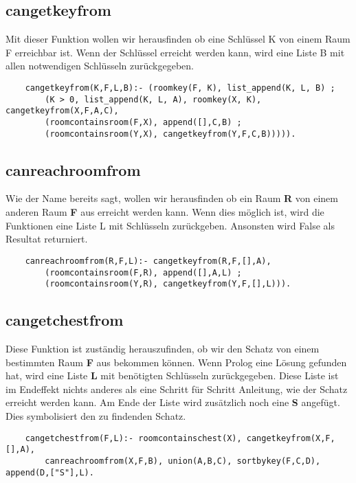 \subsection{cangetkeyfrom}
Mit dieser Funktion wollen wir herausfinden ob eine Schlüssel K von einem 
Raum F erreichbar ist. Wenn der Schlüssel erreicht werden kann, wird eine Liste B
mit allen notwendigen Schlüsseln zurückgegeben.

\begin{verbatim}
    cangetkeyfrom(K,F,L,B):- (roomkey(F, K), list_append(K, L, B) ; 
        (K > 0, list_append(K, L, A), roomkey(X, K), cangetkeyfrom(X,F,A,C), 
        (roomcontainsroom(F,X), append([],C,B) ; 
        (roomcontainsroom(Y,X), cangetkeyfrom(Y,F,C,B))))).
\end{verbatim}

\subsection{canreachroomfrom}
Wie der Name bereits sagt, wollen wir herausfinden ob ein Raum \textbf{R} von einem
anderen Raum \textbf{F} aus erreicht werden kann. Wenn dies möglich ist, wird die Funktionen
eine Liste L mit Schlüsseln zurückgeben. Ansonsten wird False als Resultat returniert.

\begin{verbatim}
    canreachroomfrom(R,F,L):- cangetkeyfrom(R,F,[],A), 
        (roomcontainsroom(F,R), append([],A,L) ; 
        (roomcontainsroom(Y,R), cangetkeyfrom(Y,F,[],L))).
\end{verbatim}

\subsection{cangetchestfrom}
Diese Funktion ist zuständig herauszufinden, ob wir den Schatz von einem bestimmten
Raum \textbf{F} aus bekommen können. Wenn Prolog eine Lösung gefunden hat, wird eine
Liste \textbf{L} mit benötigten Schlüsseln zurückgegeben. Diese Liste ist im Endeffekt
nichts anderes als eine Schritt für Schritt Anleitung, wie der Schatz erreicht werden 
kann. Am Ende der Liste wird zusätzlich noch eine \textbf{S} angefügt. Dies symbolisiert 
den zu findenden Schatz.

\begin{verbatim}
    cangetchestfrom(F,L):- roomcontainschest(X), cangetkeyfrom(X,F,[],A),
        canreachroomfrom(X,F,B), union(A,B,C), sortbykey(F,C,D), append(D,["S"],L).
\end{verbatim}

